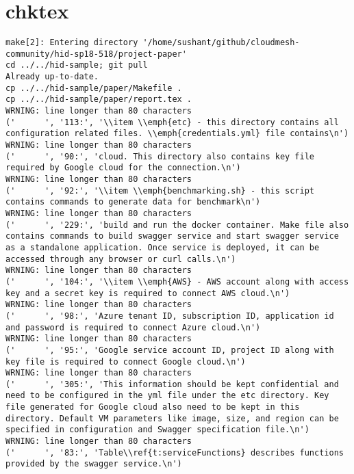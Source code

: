 \appendix
\section{chktex}
\begin{tiny}
\begin{verbatim}
make[2]: Entering directory '/home/sushant/github/cloudmesh-community/hid-sp18-518/project-paper'
cd ../../hid-sample; git pull
Already up-to-date.
cp ../../hid-sample/paper/Makefile .
cp ../../hid-sample/paper/report.tex .
WRNING: line longer than 80 characters
('      ', '113:', '\\item \\emph{etc} - this directory contains all configuration related files. \\emph{credentials.yml} file contains\n')
WRNING: line longer than 80 characters
('      ', '90:', 'cloud. This directory also contains key file required by Google cloud for the connection.\n')
WRNING: line longer than 80 characters
('      ', '92:', '\\item \\emph{benchmarking.sh} - this script contains commands to generate data for benchmark\n')
WRNING: line longer than 80 characters
('      ', '229:', 'build and run the docker container. Make file also contains commands to build swagger service and start swagger service as a standalone application. Once service is deployed, it can be accessed through any browser or curl calls.\n')
WRNING: line longer than 80 characters
('      ', '104:', '\\item \\emph{AWS} - AWS account along with access key and a secret key is required to connect AWS cloud.\n')
WRNING: line longer than 80 characters
('      ', '98:', 'Azure tenant ID, subscription ID, application id and password is required to connect Azure cloud.\n')
WRNING: line longer than 80 characters
('      ', '95:', 'Google service account ID, project ID along with key file is required to connect Google cloud.\n')
WRNING: line longer than 80 characters
('      ', '305:', 'This information should be kept confidential and need to be configured in the yml file under the etc directory. Key file generated for Google cloud also need to be kept in this directory. Default VM parameters like image, size, and region can be specified in configuration and Swagger specification file.\n')
WRNING: line longer than 80 characters
('      ', '83:', 'Table\\ref{t:serviceFunctions} describes functions provided by the swagger service.\n')

\end{verbatim}
\end{tiny}
